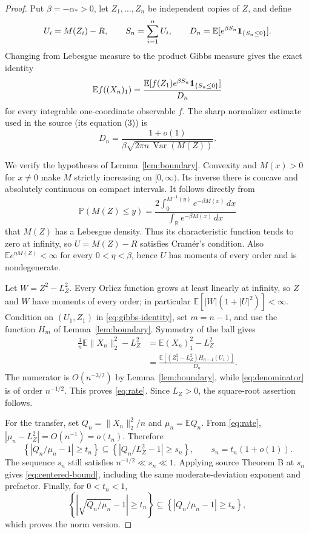 \documentclass[11pt]{article}
\newcommand{\E}{\mathbb E}
\newcommand{\Pp}{\mathbb P}
\newcommand{\Var}{\operatorname{Var}}
\begin{document}
\begin{proof}
Put $\beta=-\alpha_*>0$, let $Z_1,\ldots,Z_n$ be independent copies of
$Z$, and define
\[
 U_i=M(Z_i)-R,\qquad S_n=\sum_{i=1}^nU_i,
 \qquad D_n=\E[e^{\beta S_n}{\bf1}_{\{S_n\le0\}}].
\]
Changing from Lebesgue measure to the product Gibbs measure gives the exact
identity
\begin{equation}\label{eq:gibbs-identity}
 \E f((X_n)_1)=
 \frac{\E[f(Z_1)e^{\beta S_n}{\bf1}_{\{S_n\le0\}}]}{D_n}
\end{equation}
for every integrable one-coordinate observable $f$.  The sharp normalizer
estimate used in the source (its equation (3)) is
\begin{equation}\label{eq:denominator}
 D_n=\frac{1+o(1)}{\beta\sqrt{2\pi n\,\Var(M(Z))}}.
\end{equation}

We verify the hypotheses of Lemma~\ref{lem:boundary}.  Convexity and
$M(x)>0$ for $x\ne0$ make $M$ strictly increasing on $[0,\infty)$.
Its inverse there is concave and absolutely continuous on compact intervals.
It follows directly from
\[
 \Pp(M(Z)\le y)=
 \frac{2\int_0^{M^{-1}(y)}e^{-\beta M(x)}\,dx}
      {\int_{\mathbb R}e^{-\beta M(x)}\,dx}
\]
that $M(Z)$ has a Lebesgue density.  Thus its characteristic function tends
to zero at infinity, so $U=M(Z)-R$ satisfies Cram\'er's condition.  Also
$\E e^{\eta M(Z)}<\infty$ for every $0<\eta<\beta$, hence $U$ has moments
of every order and is nondegenerate.

Let $W=Z^2-L_Z^2$.  Every Orlicz function grows at least linearly at
infinity, so $Z$ and $W$ have moments of every order; in particular
$\E[|W|(1+|U|^2)]<\infty$.  Condition on $(U_1,Z_1)$ in
\eqref{eq:gibbs-identity}, set $m=n-1$, and use the function $H_m$ of
Lemma~\ref{lem:boundary}.  Symmetry of the ball gives
\begin{align*}
 \frac1n\E\|X_n\|_2^2-L_Z^2
 &=\E (X_n)_1^2-L_Z^2 \\
 &=\frac{\E[(Z_1^2-L_Z^2)H_{n-1}(U_1)]}{D_n}.
\end{align*}
The numerator is $O(n^{-3/2})$ by Lemma~\ref{lem:boundary}, while
\eqref{eq:denominator} is of order $n^{-1/2}$.  This proves
\eqref{eq:rate}.  Since $L_Z>0$, the square-root assertion follows.

For the transfer, set $Q_n=\|X_n\|_2^2/n$ and
$\mu_n=\E Q_n$.  From \eqref{eq:rate},
$|\mu_n-L_Z^2|=O(n^{-1})=o(t_n)$.  Therefore
\[
 \left\{\left|Q_n/\mu_n-1\right|\ge t_n\right\}
 \subseteq
 \left\{\left|Q_n/L_Z^2-1\right|\ge s_n\right\},
 \qquad s_n=t_n(1+o(1)).
\]
The sequence $s_n$ still satisfies $n^{-1/2}\ll s_n\ll1$.  Applying source
Theorem B at $s_n$ gives \eqref{eq:centered-bound}, including the same
moderate-deviation exponent and prefactor.  Finally, for $0<t_n<1$,
\[
 \left\{\left|\sqrt{Q_n/\mu_n}-1\right|\ge t_n\right\}
 \subseteq \left\{\left|Q_n/\mu_n-1\right|\ge t_n\right\},
\]
which proves the norm version.
\end{proof}
\end{document}
